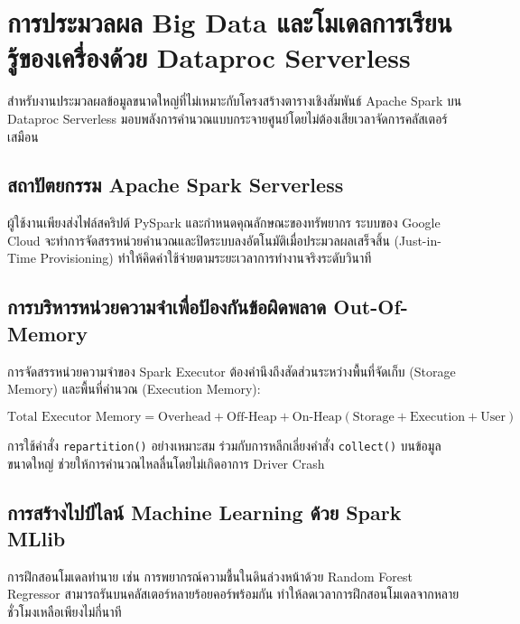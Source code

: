 \chapter{การประมวลผล Big Data และโมเดลการเรียนรู้ของเครื่องด้วย Dataproc Serverless}

สำหรับงานประมวลผลข้อมูลขนาดใหญ่ที่ไม่เหมาะกับโครงสร้างตารางเชิงสัมพันธ์ Apache Spark บน Dataproc Serverless มอบพลังการคำนวณแบบกระจายศูนย์โดยไม่ต้องเสียเวลาจัดการคลัสเตอร์เสมือน

\section{สถาปัตยกรรม Apache Spark Serverless}

ผู้ใช้งานเพียงส่งไฟล์สคริปต์ PySpark และกำหนดคุณลักษณะของทรัพยากร ระบบของ Google Cloud จะทำการจัดสรรหน่วยคำนวณและปิดระบบลงอัตโนมัติเมื่อประมวลผลเสร็จสิ้น (Just-in-Time Provisioning) ทำให้คิดค่าใช้จ่ายตามระยะเวลาการทำงานจริงระดับวินาที

\section{การบริหารหน่วยความจำเพื่อป้องกันข้อผิดพลาด Out-Of-Memory}

การจัดสรรหน่วยความจำของ Spark Executor ต้องคำนึงถึงสัดส่วนระหว่างพื้นที่จัดเก็บ (Storage Memory) และพื้นที่คำนวณ (Execution Memory):

\begin{equation}
\text{Total Executor Memory} = \text{Overhead} + \text{Off-Heap} + \text{On-Heap} (\text{Storage} + \text{Execution} + \text{User})
\end{equation}

การใช้คำสั่ง \texttt{repartition()} อย่างเหมาะสม ร่วมกับการหลีกเลี่ยงคำสั่ง \texttt{collect()} บนข้อมูลขนาดใหญ่ ช่วยให้การคำนวณไหลลื่นโดยไม่เกิดอาการ Driver Crash

\section{การสร้างไปป์ไลน์ Machine Learning ด้วย Spark MLlib}

การฝึกสอนโมเดลทำนาย เช่น การพยากรณ์ความชื้นในดินล่วงหน้าด้วย Random Forest Regressor สามารถรันบนคลัสเตอร์หลายร้อยคอร์พร้อมกัน ทำให้ลดเวลาการฝึกสอนโมเดลจากหลายชั่วโมงเหลือเพียงไม่กี่นาที
